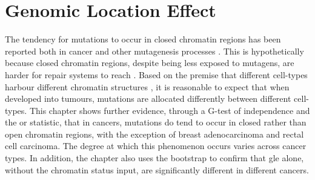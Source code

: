\chapter{Genomic Location Effect}\label{gle}

The tendency for mutations to occur in closed \gls{chromatin} regions has been reported both in cancer and other mutagenesis processes \citep{Polak2015,Prendergast2007ChromatinGenome}. This is hypothetically because closed chromatin regions, despite being less exposed to mutagens, are harder for repair systems to reach \citep{Prendergast2007ChromatinGenome,Teng1997ExcisionSequences, Morse2002PhotoreactivationCerevisiae}. Based on the premise that different cell-types harbour different chromatin structures \citep{Kundaje2015IntegrativeEpigenomes}, it is reasonable to expect that when developed into tumours, mutations are allocated differently between different cell-types. This chapter shows further evidence, through a G-test of independence and the \gls{or} statistic, that in cancers, mutations do tend to occur in closed rather than open chromatin regions, with the exception of breast adenocarcinoma and rectal cell carcinoma. The degree at which this phenomenon occurs varies across cancer types. In addition, the chapter also uses the \gls{bootstrap} to confirm that \gls{gle} alone, without the chromatin status input, are significantly different in different cancers. 